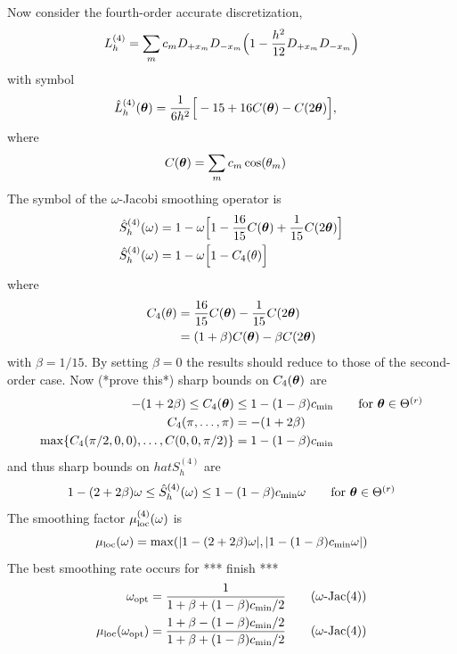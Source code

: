\documentclass{article}
\begin{document}
Now consider the fourth-order accurate discretization,
\[
   L_h^{(4)} = \sum_m c_m D_{+x_m}D_{-x_m}\Big( 1 - {h^2\over12} D_{+x_m}D_{-x_m} \Big)
\]
with symbol
\begin{align*}
  \hat{L}_h^{(4)}(\boldsymbol{\theta}) &= {1\over 6 h^2}\Big[ -15 + 16 C(\boldsymbol{\theta}) - C(2\boldsymbol{\theta}) \Big],
\end{align*}  
where 
\begin{align*}
  C(\boldsymbol{\theta}) &=\sum_m c_m\cos(\theta_m) 
\end{align*}  
The symbol of the $\omega$-Jacobi smoothing operator is
\begin{align*}
    \hat{S}_h^{(4)}(\omega)  &= 1 - \omega \Big[ 1 - {16\over15}C(\boldsymbol{\theta}) + {1\over 15}C(2\boldsymbol{\theta}) \Big] \\
    \hat{S}_h^{(4)}(\omega)  &= 1 - \omega \Big[ 1 - C_4(\theta)  \Big]
\end{align*} 
where
\begin{align*}
     C_4(\theta) &= {16\over15}C(\boldsymbol{\theta}) - {1\over 15}C(2\boldsymbol{\theta}) \\
                 &= (1+\beta)C(\boldsymbol{\theta}) - \beta C(2\boldsymbol{\theta})
\end{align*}   
with $\beta=1/15$. By setting $\beta=0$ the results should reduce to those of the second-order case.
Now (*prove this*) sharp bounds on $C_4(\boldsymbol{\theta})$ are
\begin{align*}
      -(1+2\beta) \le C_4(\boldsymbol{\theta}) &\le 1 - (1-\beta) c_{\rm min} \qquad\mbox{for $\boldsymbol{\theta}\in\Theta^{(r)}$} \\
    C_4(\pi,\ldots,\pi)& =  -(1+2\beta) \\
    \max \{ C_4(\pi/2,0,0),\ldots,C(0,0,\pi/2) \}  &= 1 - (1-\beta) c_{\rm min}
\end{align*} 
and thus sharp bounds on $hat{S}_h^{(4)}$ are
\[
  1 - {(2+2\beta)} \omega  \le  \hat{S}_h^{(4)}(\omega) \le 1 - {(1-\beta)}c_{\rm min}\omega \qquad\mbox{for $\boldsymbol{\theta}\in\Theta^{(r)}$}
\]
The smoothing factor $\mu_{\rm loc}^{(4)}(\omega)$ is 
\[
   \mu_{\rm loc} (\omega) = \max(\vert 1 - {(2+2\beta)} \omega\vert, \vert 1 - {(1-\beta)}c_{\rm min}\omega \vert )
\]
The best smoothing rate occurs for *** finish ***
\begin{align*}
  \omega_{\rm opt} &= {1\over 1+\beta+ (1-\beta)c_{\rm min}/2} \qquad\mbox{($\omega$-Jac(4))}\\
 \mu_{\rm loc}(\omega_{\rm opt}) &= { 1+\beta- (1-\beta)c_{\rm min}/2 \over 1+\beta+ (1-\beta)c_{\rm min}/2} \qquad\mbox{($\omega$-Jac(4))}
\end{align*}
\end{document}

